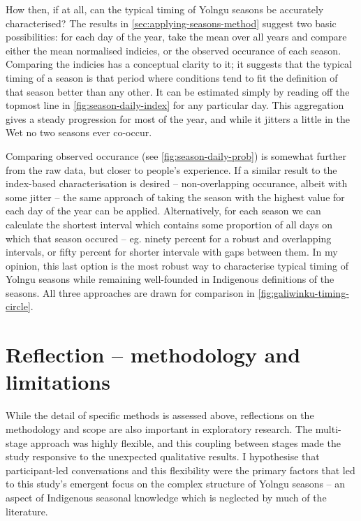 How then, if at all, can the typical timing of Yolngu seasons be accurately
characterised?  The results in \cref{sec:applying-seasons-method} suggest two
basic possibilities: for each day of the year, take the mean over all years
and compare either the mean normalised indicies, or the observed occurance
of each season.
%
Comparing the indicies has a conceptual clarity to it; it suggests that the
typical timing of a season is that period where conditions tend to fit the
definition of that season better than any other.  It can be estimated simply
by reading off the topmost line in \cref{fig:season-daily-index} for any
particular day.  This aggregation gives a steady progression for most of the
year, and while it jitters a little in the Wet no two seasons ever co-occur.

Comparing observed occurance (see \cref{fig:season-daily-prob}) is somewhat
further from the raw data, but closer to people's experience.  If a similar
result to the index-based characterisation is desired -- non-overlapping
occurance, albeit with some jitter -- the same approach of taking the season
with the highest value for each day of the year can be applied.
%
Alternatively, for each season we can calculate the shortest interval which
contains some proportion of all days on which that season occured -- eg.
ninety percent for a robust and overlapping intervals, or fifty percent for
shorter intervale with gaps between them.  In my opinion, this last option
is the most robust way to characterise typical timing of Yolngu seasons while
remaining well-founded in Indigenous definitions of the seasons.
%
All three approaches are drawn for comparison in \cref{fig:galiwinku-timing-circle}.



\section{Reflection -- methodology and limitations}
\label{sec:disc-reflection}

While the detail of specific methods is assessed above, reflections on the
methodology and scope are also important in exploratory research.  The
multi-stage approach was highly flexible, and this coupling between stages
made the study responsive to the unexpected qualitative results.  I hypothesise
that participant-led conversations and this flexibility were the primary
factors that led to this study's emergent focus on the complex structure of
Yolngu seasons -- an aspect of Indigenous seasonal knowledge which is neglected
by much of the literature.

